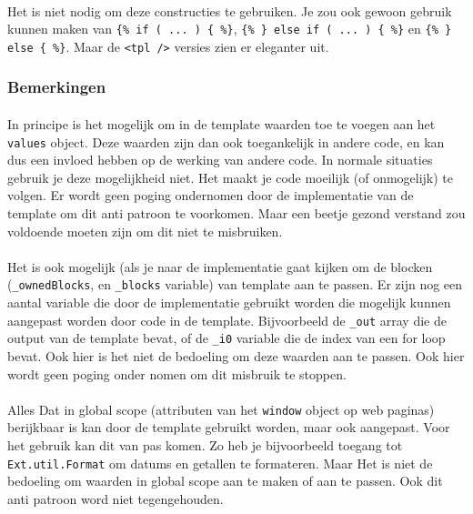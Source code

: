 \paragraph {} Het is niet nodig om deze constructies te gebruiken. Je zou ook gewoon
gebruik kunnen maken van \lstinline|{% if ( ... ) { %}|,
\lstinline|{% } else if ( ... ) { %}| en \lstinline|{% } else { %}|. Maar de
\lstinline{<tpl />} versies zien er eleganter uit.


\subsubsection {Bemerkingen}

\paragraph {} In principe is het mogelijk om in de template waarden toe te voegen aan het
\lstinline{values} object. Deze waarden zijn dan ook toegankelijk in andere code, en kan
dus een invloed hebben op de werking van andere code. In normale situaties gebruik je deze
mogelijkheid niet. Het maakt je code moeilijk (of onmogelijk) te volgen. Er wordt geen
poging ondernomen door de implementatie van de template om dit anti patroon te voorkomen.
Maar een beetje gezond verstand zou voldoende moeten zijn om dit niet te misbruiken.


\paragraph {} Het is ook mogelijk (als je naar de implementatie gaat kijken om de blocken
(\lstinline{_ownedBlocks}, en \lstinline{_blocks} variable)
van template aan te passen. Er zijn nog een aantal variable die door de implementatie
gebruikt worden die mogelijk kunnen aangepast worden door code in de template.
Bijvoorbeeld de \lstinline{_out} array die de output van de template bevat, of de
\lstinline{_i0} variable die de index van een for loop bevat. Ook hier is het niet de
bedoeling om deze waarden aan te passen. Ook hier wordt geen poging onder nomen om dit
misbruik te stoppen.

\paragraph {} Alles Dat in global scope (attributen van het \lstinline{window} object op
web paginas) berijkbaar is kan door de template gebruikt worden, maar ook aangepast. Voor
het gebruik kan dit van pas komen. Zo heb je bijvoorbeeld toegang tot
\lstinline{Ext.util.Format} om datums en getallen te formateren. Maar Het is niet de
bedoeling om waarden in global scope aan te maken of aan te passen. Ook dit anti
patroon word niet tegengehouden.

